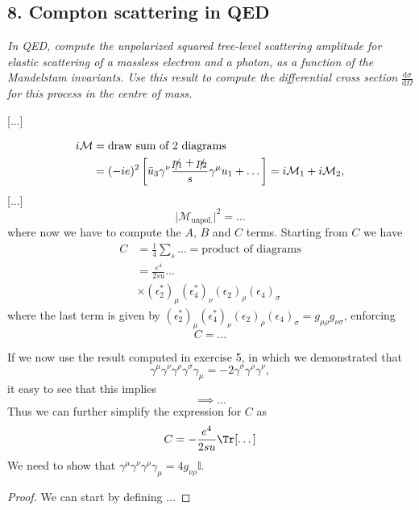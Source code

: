 \subsection*{8. Compton scattering in QED}


\begin{center}
    \textit{In QED, compute the unpolarized squared tree-level scattering amplitude for elastic scattering of a massless electron and a photon, as a function of the Mandelstam invariants. Use this result to compute the differential cross section} \(\tfrac{\mathrm{d}\sigma}{\mathrm{d}\Omega}\) \textit{for this process in the centre of mass.}
\end{center}

[...]

\[
    \begin{aligned}
        i \mathcal{M} & = \text{draw sum of 2 diagrams}                                                                                                                       \\
                      & = (-ie)^2 \left[ \bar{u}_3 \gamma^{\nu} \frac{\slashed{p_1} + \slashed{p_2}}{s} \gamma^{\mu} u_1 + \dots \right] = i \mathcal{M}_1 + i \mathcal{M}_2,
    \end{aligned}
\]
[...]
\[
    \vert \mathcal{M}_{\text{unpol.}} \vert^2 = \dots
\]
where now we have to compute the \(A\), \(B\) and \(C\) terms. Starting from \(C\) we have
\[
    \begin{aligned}
        C & = \frac{1}{4} \sum_{s} \dots = \text{product of diagrams}                              \\
          & = \frac{e^4}{2 s u}\dots                                                               \\
          & \times (\epsilon^*_2)_\mu (\epsilon_4^*)_\nu (\epsilon_2)_{\rho} (\epsilon_4)_{\sigma}
    \end{aligned}
\]
where the last term is given by \((\epsilon^*_2)_\mu (\epsilon_4^*)_\nu (\epsilon_2)_{\rho} (\epsilon_4)_{\sigma} = g_{\mu \rho} g_{\nu \sigma}\), enforcing
\[
    C = \dots
\]

If we now use the result computed in exercise 5, in which we demonstrated that
\[
    \gamma^{\mu} \gamma^{\nu} \gamma^{\rho} \gamma^{\sigma} \gamma_{\mu} = - 2 \gamma^{\sigma} \gamma^{\rho} \gamma^{\nu},
\]
it easy to see that this implies
\[
    \implies \dots
\]
Thus we can further simplify the expression for \(C\) as
\[
    C = - \frac{e^4}{2 s u} \Tr[ \dots ]
\]
We need to show that \(\gamma^{\mu} \gamma^{\nu} \gamma^{\rho} \gamma_{\mu} = 4 g_{\nu \rho} \mathbb{I}\).
\begin{proof}
    We can start by defining ...
\end{proof}

